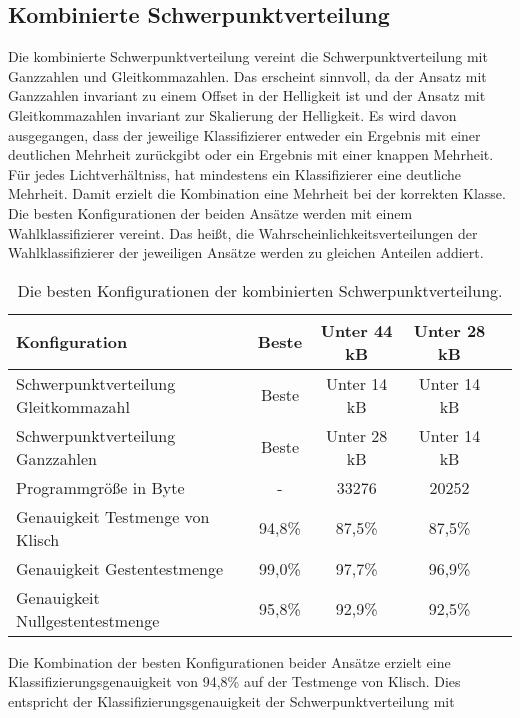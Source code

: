 \subsection{Kombinierte Schwerpunktverteilung}
Die kombinierte Schwerpunktverteilung vereint die Schwerpunktverteilung mit Ganzzahlen und Gleitkommazahlen. Das erscheint sinnvoll, da der Ansatz mit Ganzzahlen invariant zu einem Offset in der
Helligkeit ist und der Ansatz mit Gleitkommazahlen invariant zur Skalierung der Helligkeit.
\newline
\newline
Es wird davon ausgegangen, dass der jeweilige Klassifizierer entweder ein Ergebnis mit einer deutlichen Mehrheit zurückgibt oder ein Ergebnis mit einer knappen Mehrheit. Für jedes Lichtverhältniss, hat mindestens ein
Klassifizierer eine deutliche Mehrheit. Damit erzielt die Kombination eine Mehrheit bei der korrekten Klasse. Die besten Konfigurationen der beiden Ansätze werden mit einem Wahlklassifizierer vereint.
Das heißt, die Wahrscheinlichkeitsverteilungen der Wahlklassifizierer der jeweiligen Ansätze werden zu gleichen Anteilen addiert.
\begin{table}[h!]
    \centering
    \begin{tabular}{ | l | c | c | c | c |}
        \hline
        Konfiguration & Beste & Unter 44 kB & Unter 28 kB \\\hline
        Schwerpunktverteilung Gleitkommazahl & Beste & Unter 14 kB & Unter 14 kB \\\hline
        Schwerpunktverteilung Ganzzahlen & Beste &  Unter 28 kB & Unter 14 kB \\\hline
        Programmgröße in Byte & - & 33276 & 20252 \\\hline
        Genauigkeit Testmenge von Klisch & 94,8\% & 87,5\% & 87,5\% \\\hline
        Genauigkeit Gestentestmenge & 99,0\% & 97,7\% & 96,9\% \\\hline
        Genauigkeit Nullgestentestmenge & 95,8\% & 92,9\% & 92,5\% \\\hline
    \end{tabular}
    \caption{Die besten Konfigurationen der kombinierten Schwerpunktverteilung.}
    \label{tab:schwerpunktverteilung_int_and_float}
\end{table}
\newline
\newline
Die Kombination der besten Konfigurationen beider Ansätze erzielt eine Klassifizierungsgenauigkeit von 94,8\% auf der Testmenge von Klisch. Dies entspricht der Klassifizierungsgenauigkeit der Schwerpunktverteilung mit

